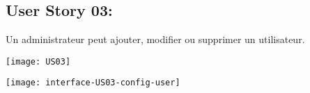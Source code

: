 \newpage{}
\subsection{User Story 03:}
Un administrateur peut ajouter, modifier ou supprimer un utilisateur.

  \begin{center}
        \texttt{[image: US03]}
  \end{center}

\newpage{}
  \begin{center}
        \texttt{[image: interface-US03-config-user]}
  \end{center}

